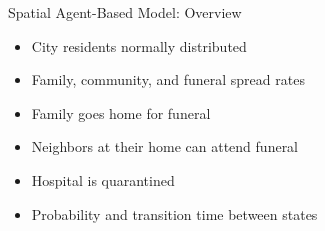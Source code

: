 \documentclass[30pt]{beamer}
\begin{document}
%
%
%      
%       
%        

\begin{frame}{Spatial Agent-Based Model: Overview}
\begin{itemize}
\item City residents normally distributed
\item Family, community, and funeral spread rates
\item Family goes home for funeral
\item Neighbors at their home can attend funeral
\item Hospital is quarantined
\item Probability and transition time between states
\end{itemize}
\end{frame}
\end{document}
